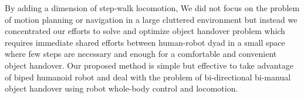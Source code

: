 By adding a dimension of step-walk locomotion, We did not focus on the problem of motion planning or navigation in a large cluttered environment but instead we concentrated our efforts to solve and optimize object handover problem which requires immediate shared efforts between human-robot dyad in a small space where few steps are necessary and enough for a comfortable and convenient object handover. Our proposed method is simple but effective to take advantage of biped humanoid robot and deal with the problem of bi-directional bi-manual object handover using robot whole-body control and locomotion.



\clearpage %






%
